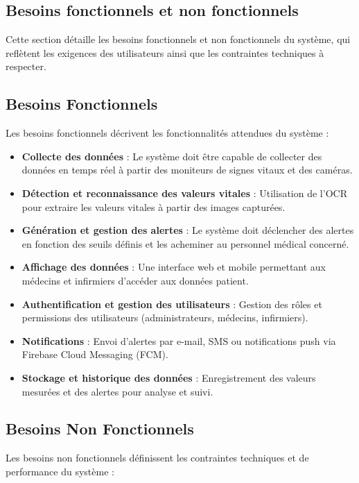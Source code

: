 \subsection{Besoins fonctionnels et non fonctionnels}
Cette section détaille les besoins fonctionnels et non fonctionnels du système, qui reflètent les exigences des utilisateurs ainsi que les contraintes techniques à respecter.

\subsection*{Besoins Fonctionnels}

Les besoins fonctionnels décrivent les fonctionnalités attendues du système :

\begin{itemize}
    \item \textbf{Collecte des données} : Le système doit être capable de collecter des données en temps réel à partir des moniteurs de signes vitaux et des caméras.
    \item \textbf{Détection et reconnaissance des valeurs vitales} : Utilisation de l'OCR pour extraire les valeurs vitales à partir des images capturées.
    \item \textbf{Génération et gestion des alertes} : Le système doit déclencher des alertes en fonction des seuils définis et les acheminer au personnel médical concerné.
    \item \textbf{Affichage des données} : Une interface web et mobile permettant aux médecins et infirmiers d’accéder aux données patient.
    \item \textbf{Authentification et gestion des utilisateurs} : Gestion des rôles et permissions des utilisateurs (administrateurs, médecins, infirmiers).
    \item \textbf{Notifications} : Envoi d’alertes par e-mail, SMS ou notifications push via Firebase Cloud Messaging (FCM).
    \item \textbf{Stockage et historique des données} : Enregistrement des valeurs mesurées et des alertes pour analyse et suivi.
\end{itemize}

\subsection*{Besoins Non Fonctionnels}

Les besoins non fonctionnels définissent les contraintes techniques et de performance du système :

